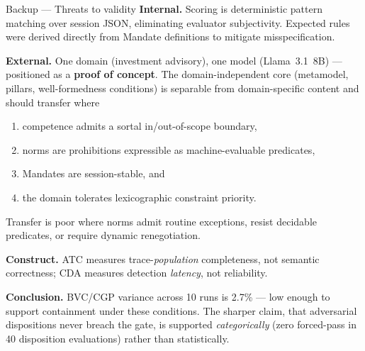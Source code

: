 \documentclass[aspectratio=169,10pt]{beamer}
\newcommand{\key}[1]{\textcolor{aiAccent}{\textbf{#1}}}
\begin{document}
\begin{frame}{Backup --- Threats to validity}
  \small
  \textbf{Internal.} Scoring is deterministic pattern matching over session JSON,
  eliminating evaluator subjectivity. Expected rules were derived directly from
  Mandate definitions to mitigate misspecification.
  \medskip

  \textbf{External.} One domain (investment advisory), one model
  (Llama~3.1~8B) --- positioned as a \key{proof of concept}. The
  domain-independent core (metamodel, pillars, well-formedness conditions) is
  separable from domain-specific content and should transfer where
  \begin{enumerate}\footnotesize
    \item competence admits a sortal in/out-of-scope boundary,
    \item norms are prohibitions expressible as machine-evaluable predicates,
    \item Mandates are session-stable, and
    \item the domain tolerates lexicographic constraint priority.
  \end{enumerate}
  Transfer is poor where norms admit routine exceptions, resist decidable
  predicates, or require dynamic renegotiation.
  \medskip

  \textbf{Construct.} ATC measures trace-\emph{population} completeness, not
  semantic correctness; CDA measures detection \emph{latency}, not reliability.
  \medskip

  \textbf{Conclusion.} BVC/CGP variance across 10 runs is 2.7\% --- low enough to
  support containment under these conditions. The sharper claim, that adversarial
  dispositions never breach the gate, is supported \emph{categorically} (zero
  forced-pass in 40 disposition evaluations) rather than statistically.
\end{frame}
\end{document}
